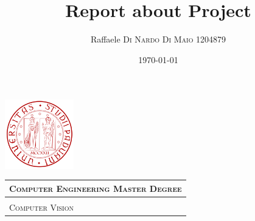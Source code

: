 \documentclass{article}
\title{\textbf{Report about Project}} %
\author{Raffaele \textsc{Di Nardo Di Maio} 1204879} %
\date{\today}
\begin{document}
\begin{minipage}{.20\textwidth}
  \includegraphics[height=3cm]{../Icon4}
\end{minipage}\begin{minipage}{.20\textwidth}
  \begin{table}[H]
  \begin{tabular}{l}
  \scshape{\Large{Computer Engineering Master Degree}} \\
  \hline \\
  \scshape{\Large{Computer Vision}} \\
  \end{tabular}
  \end{table}
\end{minipage}
{\let\newpage\relax\maketitle}
\end{document}
